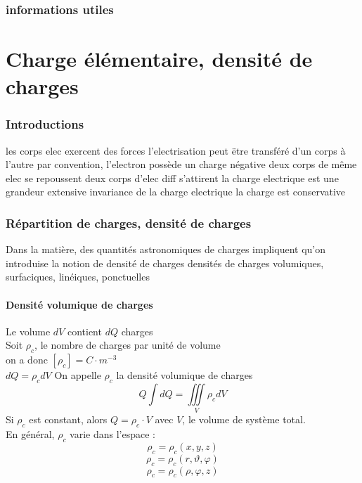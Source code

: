\documentclass[../main.tex]{subfile}
\begin{document}
\section{informations utiles}
\part{Charge élémentaire, densité de charges}

\section{Introductions}
\begin{prop}
	les corps elec exercent des forces
	l'electrisation peut ëtre transféré d'un corps à l'autre
	par convention, l'electron possède un charge négative
	deux corps de même elec se repoussent 
	deux corps d'elec diff s'attirent
	la charge electrique est une grandeur extensive
	invariance de la charge electrique
	la charge est conservative
\end{prop}

\section{Répartition de charges, densité de charges}
Dans la matière, des quantités astronomiques de charges impliquent qu'on introduise la notion de densité de charges
densités de charges volumiques, surfaciques, linéiques, ponctuelles

\subsection{Densité volumique de charges}
Le volume $dV$ contient $dQ$ charges\\
Soit $\rho_c$, le nombre de charges par unité de volume\\
on a donc $[\rho_c] = C \cdot m^{-3}$\\
$dQ = \rho_cdV$
On appelle $\rho_c$ la densité volumique de charges\\
$$Q \int dQ = \iiint\limits_V \rho_cdV$$
Si $\rho_c$ est constant, alors $Q = \rho_c \cdot V$ avec $V$, le volume de système total.\\
En général, $\rho_c$ varie dans l'espace :\\
$$\rho_c = \rho_c(x, y, z)$$
$$\rho_c = \rho_c(r, \vartheta, \varphi)$$
$$\rho_c = \rho_c(\rho, \varphi, z)$$
\end{document}
